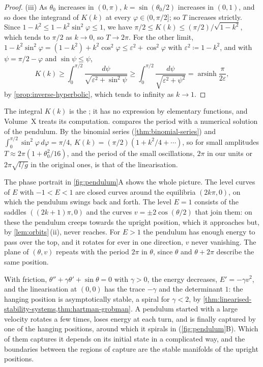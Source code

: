 \begin{proof}
(iii) As $\theta_0$ increases in $(0,\pi)$, $k=\sin(\theta_0/2)$ increases in $(0,1)$, and so does the integrand of $K(k)$ at every $\varphi\in(0,\pi/2]$; so $T$ increases strictly. Since $1-k^2\le1-k^2\sin^2\varphi\le1$, we have $\pi/2\le K(k)\le(\pi/2)/\sqrt{1-k^2}$, which tends to $\pi/2$ as $k\to0$, so $T\to2\pi$. For the other limit, $1-k^2\sin^2\varphi=(1-k^2)+k^2\cos^2\varphi\le\varepsilon^2+\cos^2\varphi$ with $\varepsilon^2\coloneqq1-k^2$, and with $\psi=\pi/2-\varphi$ and $\sin\psi\le\psi$,
\[
K(k)\ge\int_0^{\pi/2}\frac{d\psi}{\sqrt{\varepsilon^2+\sin^2\psi}}\ge\int_0^{\pi/2}\frac{d\psi}{\sqrt{\varepsilon^2+\psi^2}}=\operatorname{arsinh}\frac\pi{2\varepsilon},
\]
by \cref{prop:inverse-hyperbolic}, which tends to infinity as $k\to1$.
\end{proof}

The integral $K(k)$ is the ; it has no expression by elementary functions, and Volume~X treats its computation.  compares the period with a numerical solution of the pendulum. By the binomial series (\cref{thm:binomial-series}) and $\int_0^{\pi/2}\sin^2\varphi\,d\varphi=\pi/4$, $K(k)=(\pi/2)(1+k^2/4+\cdots)$, so for small amplitudes $T\approx2\pi(1+\theta_0^2/16)$, and the period of the small oscillations, $2\pi$ in our units or $2\pi\sqrt{l/g}$ in the original ones, is that of the linearisation.

The phase portrait in \cref{fig:pendulum}A shows the whole picture. The level curves of $E$ with $-1<E<1$ are closed curves around the equilibria $(2k\pi,0)$, on which the pendulum swings back and forth. The level $E=1$ consists of the saddles $((2k+1)\pi,0)$ and the curves $v=\pm2\cos(\theta/2)$ that join them: on these  the pendulum creeps towards the upright position, which it approaches but, by \cref{lem:orbits}\,(ii), never reaches. For $E>1$ the pendulum has enough energy to pass over the top, and it rotates for ever in one direction, $v$ never vanishing. The plane of $(\theta,v)$ repeats with the period $2\pi$ in $\theta$, since $\theta$ and $\theta+2\pi$ describe the same position.

With friction, $\theta''+\gamma\theta'+\sin\theta=0$ with $\gamma>0$, the energy decreases, $E'=-\gamma v^2$, and the linearisation at $(0,0)$ has the trace $-\gamma$ and the determinant $1$: the hanging position is asymptotically stable, a spiral for $\gamma<2$, by \cref{thm:linearised-stability-systems,thm:hartman-grobman}. A pendulum started with a large velocity rotates a few times, loses energy at each turn, and is finally captured by one of the hanging positions, around which it spirals in (\cref{fig:pendulum}B). Which of them captures it depends on its initial state in a complicated way, and the boundaries between the regions of capture are the stable manifolds of the upright positions.

